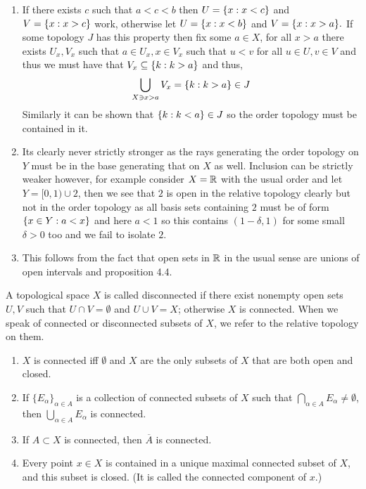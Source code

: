 \documentclass[12pt,a4paper]{article}
\begin{document}
\begin{solution}
\begin{enumerate}[label=\alph*.]
    \item If there exists $c$ such that $a<c<b$ then $U= \qty{x:x<c}$ and $V= \qty{x:x>c}$ work, otherwise let $U= \qty{x:x<b}$ and $V= \qty{x:x>a}.$ 
        If some topology $J$ has this property then fix some $a\in X$, for all $x>a$ there exists $U_x,V_x$ such that $a\in U_x,x\in V_x$ such that $u<v$ for all $u\in U,v\in V$ and thus we must have that $V_x\subseteq \qty{k:k>a}$ and thus,
        \[
            \bigcup_{X\ni x>a}V_x= \qty{k:k>a}\in J
        \]
        Similarly it can be shown that $ \qty{k:k<a}\in J$ so the order topology must be contained in it. 
    \item Its clearly never strictly stronger as the rays generating the order topology on $Y$ must be in the base generating that on $X$ as well. 
        Inclusion can be strictly weaker however, for example consider $X=\mathbb{R}$ with the usual order and let $Y=[0,1)\cup \qty{2}$, then we see that $ \qty{2}$ is open in the relative topology clearly but not in the order topology as all basis sets containing $2$ must be of form $ \qty{x\in Y:a<x}$ and here $a<1$ so this contains $(1-\delta,1)$ for some small $\delta>0$ too and we fail to isolate $2.$  
    \item This follows from the fact that open sets in $\mathbb{R}$ in the usual sense are unions of open intervals and proposition 4.4.
\end{enumerate}
\end{solution}
\begin{problem}\label{prob:4-10}
A topological space $X$ is called disconnected if there exist nonempty open sets $U, V$ such that $U \cap V = \emptyset$ and $U \cup V = X$; otherwise $X$ is connected. When we speak of connected or disconnected subsets of $X$, we refer to the relative topology on them.
\begin{enumerate}[label=\alph*.]
    \item $X$ is connected iff $\emptyset$ and $X$ are the only subsets of $X$ that are both open and closed.
    \item If $\{E_\alpha\}_{\alpha \in A}$ is a collection of connected subsets of $X$ such that $\bigcap_{\alpha \in A} E_\alpha \neq \emptyset$, then $\bigcup_{\alpha \in A} E_\alpha$ is connected.
    \item If $A \subset X$ is connected, then $\overline{A}$ is connected.
    \item Every point $x \in X$ is contained in a unique maximal connected subset of $X$, and this subset is closed. (It is called the connected component of $x$.)
\end{enumerate}
\end{problem}
\end{document}

